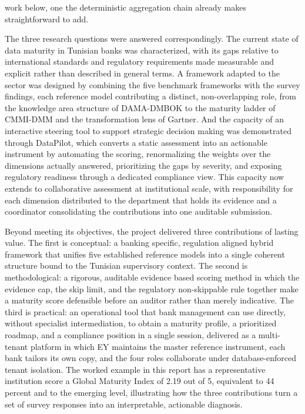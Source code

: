 work below, one the deterministic aggregation chain already makes straightforward to add.

The three research questions were answered correspondingly. The current state of data maturity in Tunisian banks was characterized, with its gaps relative to international standards and regulatory requirements made measurable and explicit rather than described in general terms. A framework adapted to the sector was designed by combining the five benchmark frameworks with the survey findings, each reference model contributing a distinct, non-overlapping role, from the knowledge area structure of DAMA-DMBOK to the maturity ladder of CMMI-DMM and the transformation lens of Gartner. And the capacity of an interactive steering tool to support strategic decision making was demonstrated through DataPilot, which converts a static assessment into an actionable instrument by automating the scoring, renormalizing the weights over the dimensions actually answered, prioritizing the gaps by severity, and exposing regulatory readiness through a dedicated compliance view. This capacity now extends to collaborative assessment at institutional scale, with responsibility for each dimension distributed to the department that holds its evidence and a coordinator consolidating the contributions into one auditable submission.

Beyond meeting its objectives, the project delivered three contributions of lasting value. The first is conceptual: a banking specific, regulation aligned hybrid framework that unifies five established reference models into a single coherent structure bound to the Tunisian supervisory context. The second is methodological: a rigorous, auditable evidence based scoring method in which the evidence cap, the skip limit, and the regulatory non-skippable rule together make a maturity score defensible before an auditor rather than merely indicative. The third is practical: an operational tool that bank management can use directly, without specialist intermediation, to obtain a maturity profile, a prioritized roadmap, and a compliance position in a single session, delivered as a multi-tenant platform in which EY maintains the master reference instrument, each bank tailors its own copy, and the four roles collaborate under database-enforced tenant isolation. The worked example in this report has a representative institution score a Global Maturity Index of 2.19 out of 5, equivalent to 44 percent and to the emerging level, illustrating how the three contributions turn a set of survey responses into an interpretable, actionable diagnosis.

